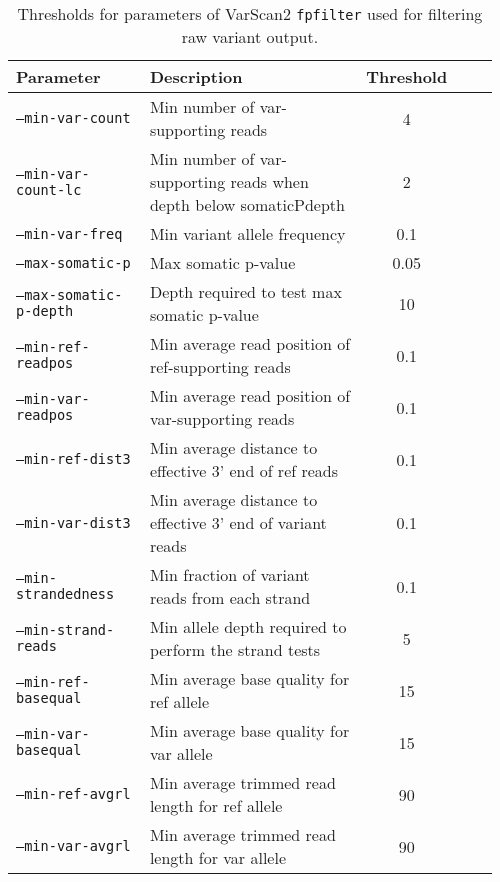 
\begin{table}[H]
\caption{Thresholds for parameters of VarScan2 \texttt{fpfilter} used for filtering raw variant output.}
\label{tbl:varscan_fpfilter_parameters}
\centering
      \begin{tabular}{p{0.3\linewidth}p{0.56\linewidth}cp{0.1\linewidth}}
        \hline
        Parameter & Description & Threshold
				\\
				\hline
				\texttt{--min-var-count} & Min number of var-supporting reads & 4
				\\
        \texttt{--min-var-count-lc} & Min number of var-supporting reads when depth below somaticPdepth & 2
        \\
        \texttt{--min-var-freq} & Min variant allele frequency & 0.1
				\\
        \texttt{--max-somatic-p} & Max somatic p-value & 0.05
				\\
        \texttt{--max-somatic-p-depth} & Depth required to test max somatic p-value & 10
				\\
        \texttt{--min-ref-readpos} & Min average read position of ref-supporting reads & 0.1
				\\
        \texttt{--min-var-readpos} & Min average read position of var-supporting reads & 0.1
				\\
        \texttt{--min-ref-dist3} & Min average distance to effective 3' end of ref reads & 0.1
				\\
        \texttt{--min-var-dist3} & Min average distance to effective 3' end of variant reads & 0.1
				\\
        \texttt{--min-strandedness} & Min fraction of variant reads from each strand & 0.1
				\\
        \texttt{--min-strand-reads} & Min allele depth required to perform the strand tests & 5
				\\
        \texttt{--min-ref-basequal} & Min average base quality for ref allele & 15
				\\
        \texttt{--min-var-basequal} & Min average base quality for var allele & 15
				\\
        \texttt{--min-ref-avgrl} & Min average trimmed read length for ref allele & 90
				\\
        \texttt{--min-var-avgrl} & Min average trimmed read length for var allele & 90
        \\

\end{tabular}
\end{table}
